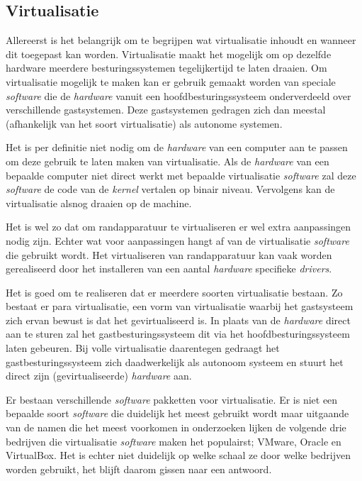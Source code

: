 \documentclass[12pt]{uva-inf-article}
\begin{document}
\subsection{Virtualisatie}
Allereerst is het belangrijk om te begrijpen wat virtualisatie inhoudt en wanneer
dit toegepast kan worden. Virtualisatie maakt het mogelijk om op dezelfde hardware
meerdere besturingssystemen tegelijkertijd te laten draaien.
Om virtualisatie mogelijk te maken kan er gebruik gemaakt worden van speciale
\textit{software} die de \textit{hardware} vanuit een hoofdbesturingssysteem
onderverdeeld over verschillende gastsystemen. Deze gastsystemen gedragen zich
dan meestal (afhankelijk van het soort virtualisatie) als autonome systemen.

Het is per definitie niet nodig om de \textit{hardware} van een computer aan te
passen om deze gebruik te laten maken van virtualisatie. Als de \textit{hardware}
van een bepaalde computer niet direct werkt met bepaalde virtualisatie \textit{software}
zal deze \textit{software} de code van de \textit{kernel} vertalen op binair niveau.
Vervolgens kan de virtualisatie alsnog draaien op de machine. \cite{adams2006comparison}

Het is wel zo dat om randapparatuur te virtualiseren er wel extra aanpassingen
nodig zijn. Echter wat voor aanpassingen hangt af van de virtualisatie \textit{software}
die gebruikt wordt. Het virtualiseren van randapparatuur kan vaak worden gerealiseerd
door het installeren van een aantal \textit{hardware} specifieke \textit{drivers}.
\cite{rossier2012embeddedxen}

Het is goed om te realiseren dat er meerdere soorten virtualisatie bestaan. Zo
bestaat er para virtualisatie, een vorm van virtualisatie waarbij het gastsysteem
zich ervan bewust is dat het gevirtualiseerd is. In plaats van de \textit{hardware}
direct aan te sturen zal het gastbesturingssysteem dit via het
hoofdbesturingssysteem laten gebeuren. Bij volle virtualisatie daarentegen gedraagt
het gastbesturingssysteem zich daadwerkelijk als autonoom systeem en stuurt het
direct zijn (gevirtualiseerde) \textit{hardware} aan.

Er bestaan verschillende \textit{software} pakketten voor virtualisatie. Er is niet
een bepaalde soort \textit{software} die duidelijk het meest gebruikt wordt maar
uitgaande van de namen die het meest voorkomen in onderzoeken lijken de volgende
drie bedrijven die virtualisatie \textit{software} maken het populairst; VMware,
Oracle en VirtualBox. Het is echter niet duidelijk op welke schaal ze door welke bedrijven
worden gebruikt, het blijft daarom gissen naar een antwoord.
\end{document}
